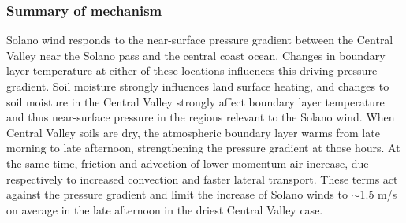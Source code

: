 \subsubsection{Summary of mechanism}
Solano wind responds to the near-surface pressure gradient between the Central Valley near the Solano pass and the central coast ocean.  Changes in boundary layer temperature at either of these locations influences this driving pressure gradient.  Soil moisture strongly influences land surface heating, and changes to soil moisture in the Central Valley strongly affect boundary layer temperature and thus near-surface pressure in the regions relevant to the Solano wind.  When Central Valley soils are dry, the atmospheric boundary layer warms from late morning to late afternoon, strengthening the pressure gradient at those hours.  At the same time, friction and advection of lower momentum air increase, due respectively to increased convection and faster lateral transport.  These terms act against the pressure gradient and limit the increase of Solano winds to $\sim$1.5 m/s on average in the late afternoon in the driest Central Valley case.

%